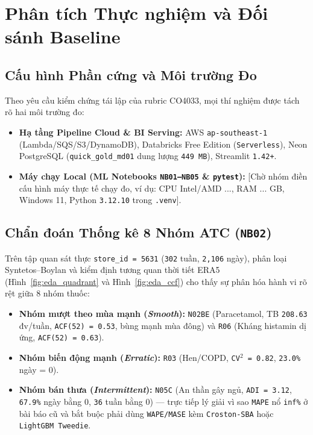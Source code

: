 \chapter{Phân tích Thực nghiệm và Đối sánh Baseline}
\label{ch:phantich_sosanh}

\section{Cấu hình Phần cứng và Môi trường Đo}
Theo yêu cầu kiểm chứng tái lập của rubric CO4033, mọi thí nghiệm được tách rõ hai môi trường đo:
\begin{itemize}[leftmargin=1.5em]
  \item \textbf{Hạ tầng Pipeline Cloud \& BI Serving:} AWS \texttt{ap-southeast-1} (Lambda/SQS/S3/DynamoDB), Databricks Free Edition (\texttt{Serverless}), Neon PostgreSQL (\texttt{quick\_gold\_md01} dung lượng \texttt{449 MB}), Streamlit \texttt{1.42+}.
  \item \textbf{Máy chạy Local (ML Notebooks \texttt{NB01--NB05} \& \texttt{pytest}):} [Chờ nhóm điền cấu hình máy thực tế chạy đo, ví dụ: CPU Intel/AMD ..., RAM ... GB, Windows 11, Python \texttt{3.12.10} trong \texttt{.venv}].
\end{itemize}

\section{Chẩn đoán Thống kê 8 Nhóm ATC (\texttt{NB02})}
Trên tập quan sát thực \texttt{store\_id = 5631} (\texttt{302} tuần, \texttt{2,106} ngày), phân loại Syntetos--Boylan \cite{syntetos2005} và kiểm định tương quan thời tiết ERA5 (Hình~\ref{fig:eda_quadrant} và Hình~\ref{fig:eda_ccf}) cho thấy sự phân hóa hành vi rõ rệt giữa 8 nhóm thuốc:
\begin{itemize}[leftmargin=1.5em]
  \item \textbf{Nhóm mượt theo mùa mạnh (\textit{Smooth}):} \texttt{N02BE} (Paracetamol, TB \texttt{208.63} đv/tuần, \texttt{ACF(52) = 0.53}, bùng mạnh mùa đông) và \texttt{R06} (Kháng histamin dị ứng, \texttt{ACF(52) = 0.63}).
  \item \textbf{Nhóm biến động mạnh (\textit{Erratic}):} \texttt{R03} (Hen/COPD, \texttt{CV$^2$ = 0.82}, \texttt{23.0\%} ngày = 0).
  \item \textbf{Nhóm bán thưa (\textit{Intermittent}):} \texttt{N05C} (An thần gây ngủ, \texttt{ADI = 3.12}, \texttt{67.9\%} ngày bằng 0, \texttt{36} tuần bằng 0) --- trực tiếp lý giải vì sao \texttt{MAPE} nổ \texttt{inf\%} ở bài báo cũ \cite{fourkiotis2024} và bắt buộc phải dùng \texttt{WAPE/MASE} kèm \texttt{Croston-SBA} hoặc \texttt{LightGBM Tweedie}.
\end{itemize}

